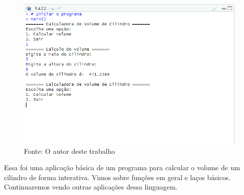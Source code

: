 	  \begin{figure}[H]
		  \centering
		  \caption{}
		  \includegraphics[width=1.0\linewidth]{Prints/screenshot019}
		  \label{fig:screenshot019}
		  {\tiny \sf Fonte: O autor deste trabalho }
	  \end{figure}
	Essa foi uma aplicação básica de um programa para calcular o volume de um cilindro de forma interativa. Vimos sobre funções em geral e laços básicos. Continuaremos vendo outras aplicações dessa linguagem.

